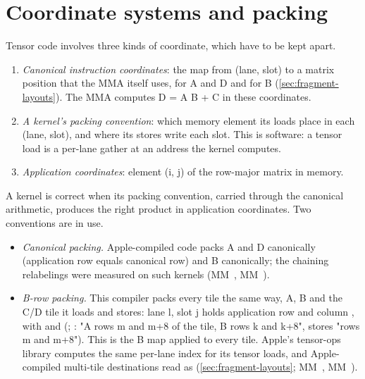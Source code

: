 \section{Coordinate systems and packing}\label{sec:coordinate-systems}

Tensor code involves three kinds of coordinate, which have to be kept apart.

\begin{enumerate}
\item \emph{Canonical instruction coordinates}: the map from (lane, slot) to a matrix position that the MMA itself
  uses,  for A and D and  for B (\cref{sec:fragment-layouts}). The MMA computes D = A B + C in
  these coordinates.
\item \emph{A kernel's packing convention}: which memory element its loads place in each (lane, slot), and where its stores
  write each slot. This is software: a tensor load is a per-lane gather at an address the kernel computes.
\item \emph{Application coordinates}: element (i, j) of the row-major matrix in memory.
\end{enumerate}

A kernel is correct when its packing convention, carried through the canonical arithmetic, produces the right product in
application coordinates. Two conventions are in use.

\begin{itemize}
\item \emph{Canonical packing.} Apple-compiled  code packs A and D canonically (application row
  equals canonical row) and B canonically; the chaining relabelings were measured on such kernels (MM~,
  MM~).
\item \emph{B-row packing.} This compiler packs every tile the same way, A, B and the C/D tile it loads and stores: lane l, slot j holds
  application row  and column , with  and
   (; : "A rows m and m+8 of the tile, B rows k
  and k+8", stores "rows m and m+8"). This is the B map applied to every tile. Apple's tensor-ops library computes the same
  per-lane index for its tensor loads, and Apple-compiled multi-tile destinations read as 
  (\cref{sec:fragment-layouts}; MM~, MM~).
\end{itemize}

